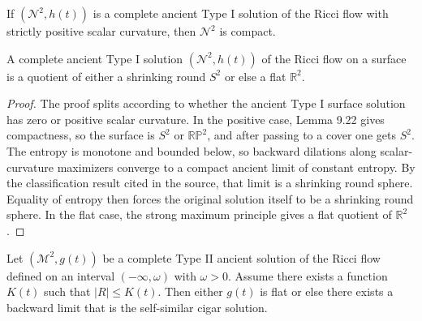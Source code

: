 \begin{lemma}
\label{ch09-lem-ancient-type-i-surface-compact}
If \((\mathcal N^2,h(t))\) is a complete ancient Type I solution of the Ricci flow with strictly positive scalar curvature, then \(\mathcal N^2\) is compact.
\end{lemma}

\begin{proposition}
\label{ch09-prop-type-i-surface-classification}
A complete ancient Type I solution \((\mathcal N^2,h(t))\) of the Ricci flow on a surface is a quotient of either a shrinking round \(S^2\) or else a flat \(\mathbb R^2\).
\end{proposition}

\begin{proof}
The proof splits according to whether the ancient Type I surface solution has zero or positive scalar curvature. In the positive case, Lemma 9.22 gives compactness, so the surface is \(S^2\) or \(\mathbb{RP}^2\), and after passing to a cover one gets \(S^2\). The entropy is monotone and bounded below, so backward dilations along scalar-curvature maximizers converge to a compact ancient limit of constant entropy. By the classification result cited in the source, that limit is a shrinking round sphere. Equality of entropy then forces the original solution itself to be a shrinking round sphere. In the flat case, the strong maximum principle gives a flat quotient of \(\mathbb R^2\).
\end{proof}

\begin{proposition}
\label{ch09-prop-type-ii-ancient-surface-limits}
Let \((\mathcal M^2,g(t))\) be a complete Type II ancient solution of the Ricci flow defined on an interval \((-\infty,\omega)\) with \(\omega>0\). Assume there exists a function \(K(t)\) such that \(|R|\le K(t)\). Then either \(g(t)\) is flat or else there exists a backward limit that is the self-similar cigar solution.
\end{proposition}

